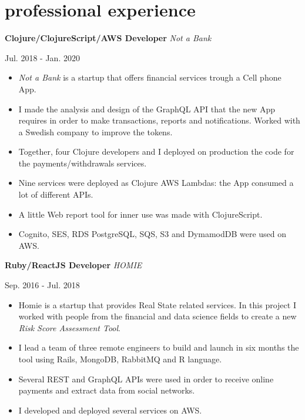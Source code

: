 \documentclass[]{k-cv}
\begin{document}
\section{professional experience}

  \textbf{Clojure/ClojureScript/AWS Developer}  \textit{Not a Bank}
  {\color{gray} {\small Jul. 2018 - Jan. 2020 \par}}
  \begin{itemize}
    \item \textit{Not a Bank} is a startup that offers financial services trough a Cell phone App.
    \item I made the analysis and design of the GraphQL API that the new App
          requires in order to make transactions, reports and notifications. Worked with a Swedish company to improve the tokens.
    \item Together, four Clojure developers and I deployed on production the code for the \linebreak
          payments/withdrawals services.
    \item Nine services were deployed as Clojure AWS Lambdas: the App consumed a lot of different APIs.
    \item A little Web report tool for inner use was made with ClojureScript.
    \item Cognito, SES, RDS PostgreSQL, SQS, S3 and DymamodDB were used on AWS.
  \end{itemize}

  \textbf{Ruby/ReactJS Developer}  \textit{HOMIE}
  {\color{gray} {\small Sep. 2016 - Jul. 2018 \par}}
  \begin{itemize}
    \item Homie is a startup that provides Real State related services. In this project I
          worked with people from the financial and data science fields to create a new
          \textit{Risk Score Assessment Tool}.
    \item I lead a team of three remote engineers to build and launch in six months the tool
          using Rails, MongoDB, RabbitMQ and R language.
    \item Several REST and GraphQL APIs were used in order to receive online payments and extract data from social networks.
    \item I developed and deployed several services on AWS.
  \end{itemize}
\end{document}
